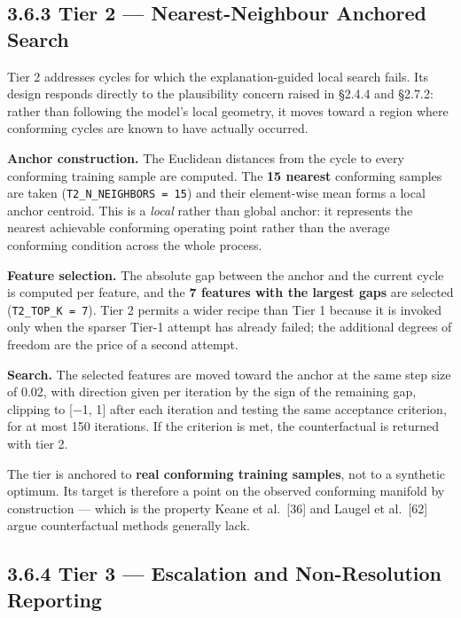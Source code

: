 \hypertarget{tier-2-nearest-neighbour-anchored-search}{%
\subsection{3.6.3 Tier 2 --- Nearest-Neighbour Anchored Search}\label{tier-2-nearest-neighbour-anchored-search}}

Tier 2 addresses cycles for which the explanation-guided local search fails. Its design responds directly to the plausibility concern raised in §2.4.4 and §2.7.2: rather than following the model's local geometry, it moves toward a region where conforming cycles are known to have actually occurred.

\textbf{Anchor construction.} The Euclidean distances from the cycle to every conforming training sample are computed. The \textbf{15 nearest} conforming samples are taken (\texttt{T2\_N\_NEIGHBORS\ =\ 15}) and their element-wise mean forms a local anchor centroid. This is a \emph{local} rather than global anchor: it represents the nearest achievable conforming operating point rather than the average conforming condition across the whole process.

\textbf{Feature selection.} The absolute gap between the anchor and the current cycle is computed per feature, and the \textbf{7 features with the largest gaps} are selected (\texttt{T2\_TOP\_K\ =\ 7}). Tier 2 permits a wider recipe than Tier 1 because it is invoked only when the sparser Tier-1 attempt has already failed; the additional degrees of freedom are the price of a second attempt.

\textbf{Search.} The selected features are moved toward the anchor at the same step size of 0.02, with direction given per iteration by the sign of the remaining gap, clipping to {[}−1, 1{]} after each iteration and testing the same acceptance criterion, for at most 150 iterations. If the criterion is met, the counterfactual is returned with tier 2.

The tier is anchored to \textbf{real conforming training samples}, not to a synthetic optimum. Its target is therefore a point on the observed conforming manifold by construction --- which is the property Keane et al.~{[}36{]} and Laugel et al.~{[}62{]} argue counterfactual methods generally lack.

\hypertarget{tier-3-escalation-and-non-resolution-reporting}{%
\subsection{3.6.4 Tier 3 --- Escalation and Non-Resolution Reporting}\label{tier-3-escalation-and-non-resolution-reporting}}

